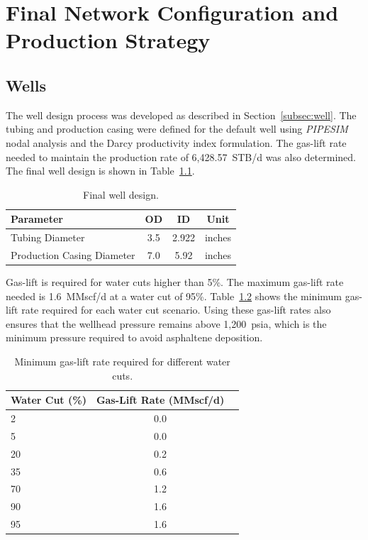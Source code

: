 
\chapter{Final Network Configuration and Production Strategy}
\label{chap:final_network}
\section{Wells}
\label{sec:res_wells}
The well design process was developed as described in Section~\ref{subsec:well}.
The tubing and production casing were defined for the default well using
\emph{PIPESIM} nodal analysis \cite{Schlumberger2023} and the Darcy productivity
index formulation. The gas-lift rate needed to maintain the
production rate of 6,428.57~STB/d was also determined. The final
well design is shown in Table~\ref{tab:well_design}.

\begin{table}[ht]
    \centering
    \caption{Final well design.}
    \label{tab:well_design}
    \begin{tabular}{lccc}
        \hline
        Parameter & OD & ID & Unit \\
        \hline
        Tubing Diameter & 3.5 & 2.922 & inches \\
        Production Casing Diameter & 7.0 & 5.92 & inches \\
        \hline
    \end{tabular}
\end{table}

Gas-lift is required for water cuts higher than 5\%. The maximum
gas-lift rate needed is 1.6~MMscf/d at a water cut of 95\%. Table~\ref{tab:gas_lift}
shows the minimum gas-lift rate required for each water cut scenario.
Using these gas-lift rates also ensures that the wellhead pressure remains above
1,200~psia, which is the minimum pressure required to avoid asphaltene deposition.

\begin{table}[ht]
    \centering
    \caption{Minimum gas-lift rate required for different water cuts.}
    \label{tab:gas_lift}
    \begin{tabular}{lcc}
        \hline
        Water Cut (\%) & Gas-Lift Rate (MMscf/d) \\
        \hline
        2  & 0.0 \\
        5  & 0.0 \\
        20 & 0.2 \\
        35 & 0.6 \\
        70 & 1.2 \\
        90 & 1.6 \\
        95 & 1.6 \\
        \hline
    \end{tabular}
\end{table}

